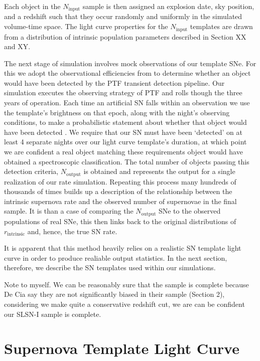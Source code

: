 \documentclass[a4paper,fleqn,usenatbib]{mnras}
\newcommand{\chris}[1]{\color{orange}#1\color{black}}
\begin{document}
Each object in the $N_\mathrm{input}$ sample is then assigned an explosion date, sky position, and a redshift such that they occur randomly and uniformly in the simulated volume-time space. The light curve properties for the $N_\mathrm{input}$ templates are drawn from a distribution of intrinsic population parameters described in Section XX and XY.

The next stage of simulation involves mock observations of our template SNe. For this we adopt the observational efficiencies from \citet{Frohmaier17} to determine whether an object would have been detected by the PTF transient detection pipeline. Our simulation executes the observing strategy of PTF and rolls though the three years of operation. Each time an artificial SN falls within an observation we use the template's brightness on that epoch, along with the night's observing conditions, to make a probabilistic statement about whether that object would have been detected \citep[an example for Type Ia SNe is presented in][]{Frohmaier17}. We require that our SN must have been `detected' on at least 4 separate nights over our light curve template's duration, at which point we are confident a real object matching these requirements object would have obtained a spectroscopic classification. The total number of objects passing this detection criteria, $N_\mathrm{output}$ is obtained and represents the output for a single realization of our rate simulation. Repeating this process many hundreds of thousands of times builds up a description of the relationship between the intrinsic supernova rate and the observed number of supernovae in the final sample. It is than a case of comparing the $N_\mathrm{output}$ SNe to the  observed populations of real SNe, this then links back to the original distributions of $r_\mathrm{intrinsic}$ and, hence, the true SN rate.

It is apparent that this method heavily relies on a realistic SN template light curve in order to produce realiable output statistics. In the next section, therefore, we describe the SN templates used within our simulations.

\chris{Note to myself. We can be reasonably sure that the sample is complete because De Cia say they are not significantly biased in their sample (Section 2), considering we make quite a conservative redshift cut, we are can be confident our SLSN-I sample is complete.}

\section{Supernova Template Light Curve}
\end{document}
